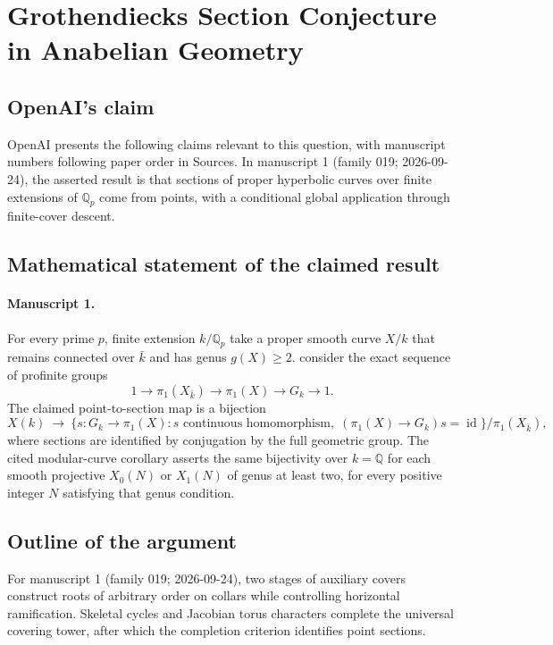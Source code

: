 \documentclass[11pt]{article}
\begin{document}
\section*{Grothendiecks Section Conjecture in Anabelian Geometry}

\subsection{OpenAI's claim}
OpenAI presents the following claims relevant to this question, with manuscript numbers following paper order in Sources. In manuscript 1 (family 019; 2026-09-24), the asserted result is that sections of proper hyperbolic curves over finite extensions of $\mathbb Q_p$ come from points, with a conditional global application through finite-cover descent.

\subsection{Mathematical statement of the claimed result}
\paragraph{Manuscript 1.}
For every prime $p$, finite extension $k/\mathbb Q_p$ take a proper smooth curve $X/k$ that remains connected over $\bar k$ and has genus $g(X)\ge2$. consider the exact sequence of profinite groups
\[
 1\longrightarrow\pi_1(X_{\bar k})\longrightarrow\pi_1(X)
 \longrightarrow G_k\longrightarrow1.
\]
The claimed point-to-section map is a bijection
\[
 X(k)\ \longrightarrow\
 \{s:G_k\to\pi_1(X):s\text{ continuous homomorphism},\;
             (\pi_1(X)\to G_k)s=\operatorname{id}\}/\pi_1(X_{\bar k}),
\]
where sections are identified by conjugation by the full geometric group. The cited modular-curve corollary asserts the same bijectivity over $k=\mathbb Q$ for each smooth projective $X_0(N)$ or $X_1(N)$ of genus at least two, for every positive integer $N$ satisfying that genus condition.

\subsection{Outline of the argument}
For manuscript 1 (family 019; 2026-09-24), two stages of auxiliary covers construct roots of arbitrary order on collars while controlling horizontal ramification. Skeletal cycles and Jacobian torus characters complete the universal covering tower, after which the completion criterion identifies point sections.
\end{document}
